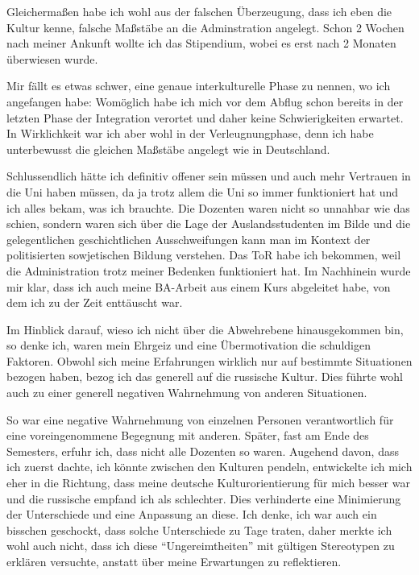 \documentclass{../../sem_paper}
\begin{document}
Gleichermaßen habe ich wohl aus der falschen Überzeugung, dass ich eben die Kultur kenne, falsche Maßstäbe an die Adminstration angelegt. Schon 2 Wochen nach meiner Ankunft wollte ich das Stipendium, wobei es erst nach 2 Monaten überwiesen wurde.

Mir fällt es etwas schwer, eine genaue interkulturelle Phase zu nennen, wo ich angefangen habe: Womöglich habe ich mich vor dem Abflug schon bereits in der letzten Phase der Integration verortet  und daher keine Schwierigkeiten erwartet. In Wirklichkeit war ich aber wohl in der Verleugnungphase, denn ich habe unterbewusst die gleichen Maßstäbe angelegt wie in Deutschland. 

Schlussendlich hätte ich definitiv offener sein müssen und auch mehr Vertrauen in die Uni haben müssen, da ja trotz allem die Uni so immer funktioniert hat und ich alles bekam, was ich brauchte. Die Dozenten waren nicht so unnahbar wie das schien, sondern waren sich über die Lage der Auslandsstudenten im Bilde und die gelegentlichen geschichtlichen Ausschweifungen kann man im Kontext der politisierten sowjetischen Bildung verstehen. Das ToR habe ich bekommen, weil die Administration trotz meiner Bedenken funktioniert hat. Im Nachhinein wurde mir klar, dass ich auch meine BA-Arbeit aus einem Kurs abgeleitet habe, von dem ich zu der Zeit enttäuscht war.

Im Hinblick darauf, wieso ich nicht über die Abwehrebene hinausgekommen bin, so denke ich, waren mein Ehrgeiz und eine Übermotivation die schuldigen Faktoren. Obwohl sich meine Erfahrungen wirklich nur auf bestimmte Situationen bezogen haben, bezog ich das generell auf die russische Kultur. Dies führte wohl auch zu einer generell negativen Wahrnehmung von anderen Situationen.

So war eine negative Wahrnehmung von einzelnen Personen verantwortlich für eine voreingenommene Begegnung mit anderen. Später, fast am Ende des Semesters, erfuhr ich, dass  nicht alle Dozenten so waren. Augehend davon, dass ich zuerst dachte, ich könnte zwischen den Kulturen pendeln, entwickelte ich mich eher in die Richtung, dass meine deutsche Kulturorientierung für mich besser war und die russische empfand ich als schlechter. Dies verhinderte eine Minimierung der Unterschiede und eine Anpassung an diese. Ich denke, ich war auch ein bisschen geschockt, dass solche Unterschiede zu Tage traten, daher merkte ich wohl auch nicht, dass ich diese “Ungereimtheiten” mit gültigen Stereotypen zu erklären versuchte, anstatt über meine Erwartungen zu reflektieren.
\end{document}

